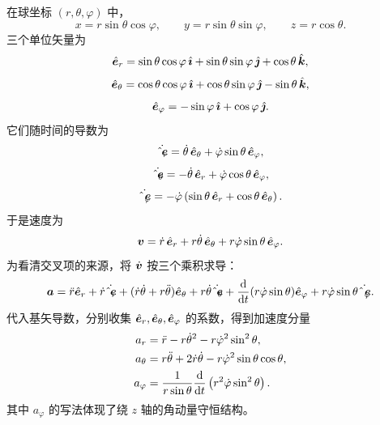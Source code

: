 在球坐标 $(r,\theta,\varphi)$ 中，
\begin{equation}
x=r\sin\theta\cos\varphi,\qquad
y=r\sin\theta\sin\varphi,\qquad
z=r\cos\theta .
\end{equation}
三个单位矢量为
\begin{equation}
\er=\sin\theta\cos\varphi\,\ii+\sin\theta\sin\varphi\,\jj+\cos\theta\,\kk,
\end{equation}
\begin{equation}
\etheta=\cos\theta\cos\varphi\,\ii+\cos\theta\sin\varphi\,\jj-\sin\theta\,\kk,
\end{equation}
\begin{equation}
\ephi=-\sin\varphi\,\ii+\cos\varphi\,\jj .
\end{equation}
它们随时间的导数为
\begin{equation}
\dot{\er}=\dot\theta\,\etheta+\dot\varphi\sin\theta\,\ephi,
\end{equation}
\begin{equation}
\dot{\etheta}=-\dot\theta\,\er+\dot\varphi\cos\theta\,\ephi,
\end{equation}
\begin{equation}
\dot{\ephi}=-\dot\varphi\left(\sin\theta\,\er+\cos\theta\,\etheta\right).
\end{equation}
于是速度为
\begin{equation}
\bv=\dot r\,\er+r\dot\theta\,\etheta+r\dot\varphi\sin\theta\,\ephi .
\label{eq:spherical-velocity}
\end{equation}
为看清交叉项的来源，将 $\dot{\bv}$ 按三个乘积求导：
\[
\ba=\ddot r\er+\dot r\dot{\er}
+(\dot r\dot\theta+r\ddot\theta)\etheta+r\dot\theta\dot{\etheta}
+\frac{\dd}{\dd t}(r\dot\varphi\sin\theta)\ephi
+r\dot\varphi\sin\theta\dot{\ephi}.
\]
代入基矢导数，分别收集 $\er,\etheta,\ephi$ 的系数，得到加速度分量
\begin{align}
a_r&=\ddot r-r\dot\theta^2-r\dot\varphi^2\sin^2\theta,\\
a_\theta&=r\ddot\theta+2\dot r\dot\theta-r\dot\varphi^2\sin\theta\cos\theta,\\
a_\varphi&=\frac{1}{r\sin\theta}\dv{}{t}\left(r^2\dot\varphi\sin^2\theta\right).
\end{align}
其中 $a_\varphi$ 的写法体现了绕 $z$ 轴的角动量守恒结构。

